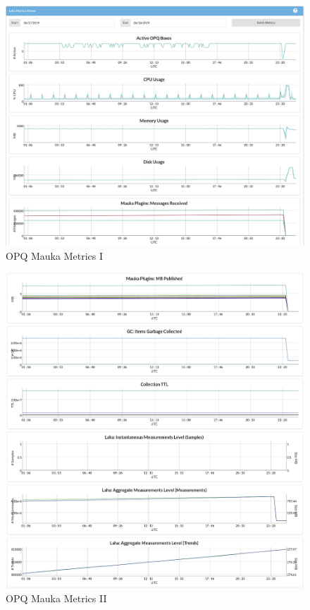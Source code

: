 \begin{figure}
	\centering
	\includegraphics[width=\linewidth]{figures/metrics_1.png}
	\caption{OPQ Mauka Metrics I}
	\label{fig:Metrics1}
\end{figure}

\begin{figure}
	\centering
	\includegraphics[width=\linewidth]{figures/metrics_2.png}
	\caption{OPQ Mauka Metrics II}
	\label{fig:Metrics2}
\end{figure}

